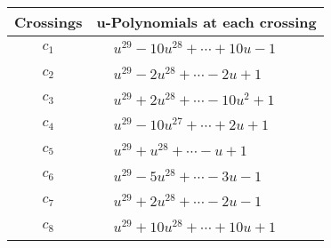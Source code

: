 \documentclass[1p]{elsarticle_modified}
\theoremstyle{definition}
\begin{document}
\begin{tabular}{m{50pt}|m{274pt}}
Crossings & \hspace{64pt}u-Polynomials at each crossing \\
\hline $$\begin{aligned}c_{1}\end{aligned}$$&$\begin{aligned}
&u^{29}-10 u^{28}+\cdots+10 u-1
\end{aligned}$\\
\hline $$\begin{aligned}c_{2}\end{aligned}$$&$\begin{aligned}
&u^{29}-2 u^{28}+\cdots-2 u+1
\end{aligned}$\\
\hline $$\begin{aligned}c_{3}\end{aligned}$$&$\begin{aligned}
&u^{29}+2 u^{28}+\cdots-10 u^2+1
\end{aligned}$\\
\hline $$\begin{aligned}c_{4}\end{aligned}$$&$\begin{aligned}
&u^{29}-10 u^{27}+\cdots+2 u+1
\end{aligned}$\\
\hline $$\begin{aligned}c_{5}\end{aligned}$$&$\begin{aligned}
&u^{29}+u^{28}+\cdots- u+1
\end{aligned}$\\
\hline $$\begin{aligned}c_{6}\end{aligned}$$&$\begin{aligned}
&u^{29}-5 u^{28}+\cdots-3 u-1
\end{aligned}$\\
\hline $$\begin{aligned}c_{7}\end{aligned}$$&$\begin{aligned}
&u^{29}+2 u^{28}+\cdots-2 u-1
\end{aligned}$\\
\hline $$\begin{aligned}c_{8}\end{aligned}$$&$\begin{aligned}
&u^{29}+10 u^{28}+\cdots+10 u+1
\end{aligned}$\\

\end{tabular}
\end{document}

